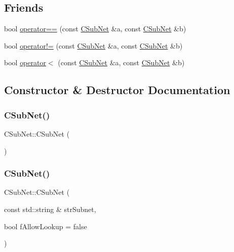 \subsection*{Friends}
\begin{DoxyCompactItemize}
\item 
bool \mbox{\hyperlink{class_c_sub_net_a386ec849433fb808a6f5a4f97893b4cd}{operator==}} (const \mbox{\hyperlink{class_c_sub_net}{C\+Sub\+Net}} \&a, const \mbox{\hyperlink{class_c_sub_net}{C\+Sub\+Net}} \&b)
\item 
bool \mbox{\hyperlink{class_c_sub_net_a009219cad6ef9a6d6da9b9a876e43b9d}{operator!=}} (const \mbox{\hyperlink{class_c_sub_net}{C\+Sub\+Net}} \&a, const \mbox{\hyperlink{class_c_sub_net}{C\+Sub\+Net}} \&b)
\item 
bool \mbox{\hyperlink{class_c_sub_net_ac6349c0d4257d2d013e3cd8f72303975}{operator$<$}} (const \mbox{\hyperlink{class_c_sub_net}{C\+Sub\+Net}} \&a, const \mbox{\hyperlink{class_c_sub_net}{C\+Sub\+Net}} \&b)
\end{DoxyCompactItemize}


\subsection{Constructor \& Destructor Documentation}
\mbox{\label{class_c_sub_net_ae3a0b1dcca899c93ab7000b51f7f4668}} 
\subsubsection{\texorpdfstring{C\+Sub\+Net()}{CSubNet()}\hspace{0.1cm}{\footnotesize\ttfamily [1/2]}}
{\footnotesize\ttfamily C\+Sub\+Net\+::\+C\+Sub\+Net (\begin{DoxyParamCaption}{ }\end{DoxyParamCaption})}

\mbox{\label{class_c_sub_net_a6e8cd7a5e46e93d3ad62896dcb5a5a78}} 
\subsubsection{\texorpdfstring{C\+Sub\+Net()}{CSubNet()}\hspace{0.1cm}{\footnotesize\ttfamily [2/2]}}
{\footnotesize\ttfamily C\+Sub\+Net\+::\+C\+Sub\+Net (\begin{DoxyParamCaption}\item[{const std\+::string \&}]{str\+Subnet,  }\item[{bool}]{f\+Allow\+Lookup = {\ttfamily false} }\end{DoxyParamCaption})\hspace{0.3cm}{\ttfamily [explicit]}}



